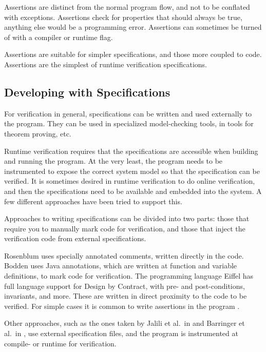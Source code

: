 \documentclass[a4paper,11pt]{kth-mag}
\begin{document}
Assertions are distinct from the normal program flow, and not to be conflated
with exceptions. Assertions check for properties that should always be true,
anything else would be a programming error. Assertions can sometimes be turned
of with a compiler or runtime flag.

Assertions are suitable for simpler specifications, and those more coupled to
code. Assertions are the simplest of runtime verification specifications.


\subsection{Developing with Specifications}

For verification in general, specifications can be written and used externally
to the program. They can be used in specialized model-checking tools, in tools
for theorem proving, etc.

Runtime verification requires that the specifications are accessible when
building and running the program. At the very least, the program needs to be
instrumented to expose the correct system model so that the specification can
be verified. It is sometimes desired in runtime verification to do online
verification, and then the specifications need to be available and embedded
into the system. A few different approaches have been tried to support this.

Approaches to writing specifications can be divided into two parts: those that
require you to manually mark code for verification, and those that inject the
verification code from external specifications.

Rosenblum \cite{rosenblum95practicalassertions} uses specially annotated
comments, written directly in the code. Bodden
\cite{bodden05efficientrv,bodden04lightweightltl} uses Java annotations, which
are written at function and variable definitions, to mark code for
verification. The programming language Eiffel has full language support for
Design by Contract, with pre- and post-conditions, invariants, and more. These
are written in direct proximity to the code to be verified. For simple cases it
is common to write assertions in the program \cite{bartetzko01jass}.

Other approaches, such as the ones taken by Jalili et al.\ in
\cite{jalili07rverl} and Barringer et al.\ in \cite{barringer03eagle}, use
external specification files, and the program is instrumented at compile- or
runtime for verification.
\end{document}
